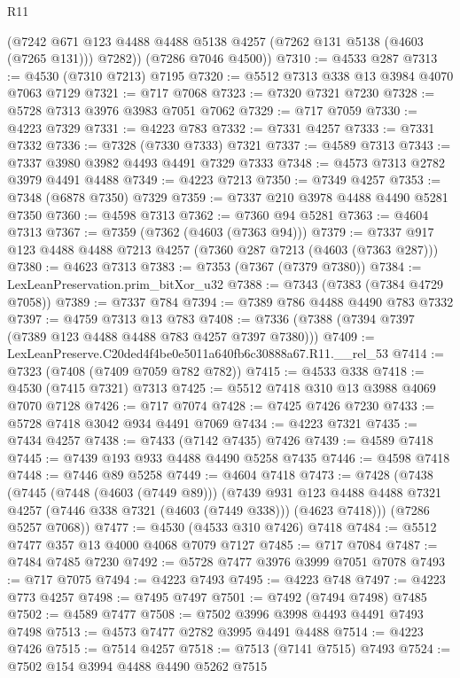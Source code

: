 \begin{lexlean}{R11}
\begin{coremodule}
        (@7242 @671 @123 @4488 @4488 @5138 @4257 (@7262 @131 @5138 (@4603 (@7265 @131))) @7282))
      (@7286 @7046 @4500))
@7310 := @4533 @287
@7313 := @4530 (@7310 @7213) @7195
@7320 := @5512 @7313 @338 @13 @3984 @4070 @7063 @7129
@7321 := @717 @7068
@7323 := @7320 @7321 @7230
@7328 := @5728 @7313 @3976 @3983 @7051 @7062
@7329 := @717 @7059
@7330 := @4223 @7329
@7331 := @4223 @783
@7332 := @7331 @4257
@7333 := @7331 @7332
@7336 := @7328 (@7330 @7333) @7321
@7337 := @4589 @7313
@7343 := @7337 @3980 @3982 @4493 @4491 @7329 @7333
@7348 := @4573 @7313 @2782 @3979 @4491 @4488
@7349 := @4223 @7213
@7350 := @7349 @4257
@7353 := @7348 (@6878 @7350) @7329
@7359 := @7337 @210 @3978 @4488 @4490 @5281 @7350
@7360 := @4598 @7313
@7362 := @7360 @94 @5281
@7363 := @4604 @7313
@7367 := @7359 (@7362 (@4603 (@7363 @94)))
@7379 := @7337 @917 @123 @4488 @4488 @7213 @4257 (@7360 @287 @7213 (@4603 (@7363 @287)))
@7380 := @4623 @7313
@7383 := @7353 (@7367 (@7379 @7380))
@7384 := LexLeanPreservation.prim_bitXor_u32
@7388 := @7343 (@7383 (@7384 @4729 @7058))
@7389 := @7337 @784
@7394 := @7389 @786 @4488 @4490 @783 @7332
@7397 := @4759 @7313 @13 @783
@7408 := @7336 (@7388 (@7394 @7397 (@7389 @123 @4488 @4488 @783 @4257 @7397 @7380)))
@7409 := LexLeanPreserve.C20ded4f4be0e5011a640fb6c30888a67.R11.__rel_53
@7414 := @7323 (@7408 (@7409 @7059 @782 @782))
@7415 := @4533 @338
@7418 := @4530 (@7415 @7321) @7313
@7425 := @5512 @7418 @310 @13 @3988 @4069 @7070 @7128
@7426 := @717 @7074
@7428 := @7425 @7426 @7230
@7433 := @5728 @7418 @3042 @934 @4491 @7069
@7434 := @4223 @7321
@7435 := @7434 @4257
@7438 := @7433 (@7142 @7435) @7426
@7439 := @4589 @7418
@7445 := @7439 @193 @933 @4488 @4490 @5258 @7435
@7446 := @4598 @7418
@7448 := @7446 @89 @5258
@7449 := @4604 @7418
@7473 := @7428
    (@7438
      (@7445
        (@7448 (@4603 (@7449 @89)))
        (@7439
          @931
          @123
          @4488
          @4488
          @7321
          @4257
          (@7446 @338 @7321 (@4603 (@7449 @338)))
          (@4623 @7418)))
      (@7286 @5257 @7068))
@7477 := @4530 (@4533 @310 @7426) @7418
@7484 := @5512 @7477 @357 @13 @4000 @4068 @7079 @7127
@7485 := @717 @7084
@7487 := @7484 @7485 @7230
@7492 := @5728 @7477 @3976 @3999 @7051 @7078
@7493 := @717 @7075
@7494 := @4223 @7493
@7495 := @4223 @748
@7497 := @4223 @773 @4257
@7498 := @7495 @7497
@7501 := @7492 (@7494 @7498) @7485
@7502 := @4589 @7477
@7508 := @7502 @3996 @3998 @4493 @4491 @7493 @7498
@7513 := @4573 @7477 @2782 @3995 @4491 @4488
@7514 := @4223 @7426
@7515 := @7514 @4257
@7518 := @7513 (@7141 @7515) @7493
@7524 := @7502 @154 @3994 @4488 @4490 @5262 @7515

\end{coremodule}
\end{lexlean}
